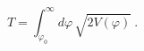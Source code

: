 \begin{equation}\label{thin1}
T = \int_{\varphi_0}^\infty d\varphi\, \sqrt{2V (\varphi)}
\ .
\end{equation}

